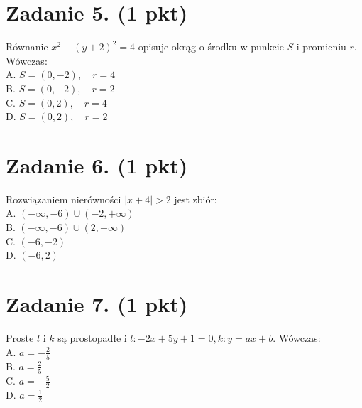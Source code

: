 \documentclass[10pt]{article}
\begin{document}
\section*{Zadanie 5. (1 pkt)}
Równanie \(x^{2}+(y+2)^{2}=4\) opisuje okrąg o środku w punkcie \(S\) i promieniu \(r\). Wówczas:\\
A. \(S=(0,-2), \quad r=4\)\\
B. \(S=(0,-2), \quad r=2\)\\
C. \(S=(0,2), \quad r=4\)\\
D. \(S=(0,2), \quad r=2\)

\section*{Zadanie 6. (1 pkt)}
Rozwiązaniem nierówności \(|x+4|>2\) jest zbiór:\\
A. \((-\infty,-6) \cup(-2,+\infty)\)\\
B. \((-\infty,-6) \cup(2,+\infty)\)\\
C. \((-6,-2)\)\\
D. \((-6,2)\)

\section*{Zadanie 7. (1 pkt)}
Proste \(l\) i \(k\) są prostopadłe i \(l:-2 x+5 y+1=0, k: y=a x+b\). Wówczas:\\
A. \(a=-\frac{2}{5}\)\\
B. \(a=\frac{2}{5}\)\\
C. \(a=-\frac{5}{2}\)\\
D. \(a=\frac{1}{2}\)
\end{document}
